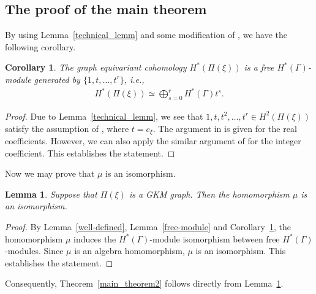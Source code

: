 \documentclass[12pt]{amsart}
\newtheorem{lemma}[theorem]{Lemma}
\newtheorem{corollary}[theorem]{Corollary}
\theoremstyle{definition}
\theoremstyle{remark}
\numberwithin{equation}{section}
\begin{document}
\subsection{The proof of the main theorem}
\label{sect:5.4}

By using Lemma~\ref{technical_lemm} and some modification of \cite[Theorem~3.5]{GSZ}, we have the following corollary.
\begin{corollary}
\label{Q_k}
The graph equivariant cohomology $H^{*}(\Pi(\xi))$ is a free $H^{*}(\Gamma)$-module generated by $\{1,t,\ldots,t^{r}\}$, i.e.,
\begin{align}
\label{decomposition_of_f}
H^{*}(\Pi(\xi))\simeq \bigoplus_{s=0}^{r}H^{*}(\Gamma)t^{s}.
\end{align}
\end{corollary}
\begin{proof}
Due to Lemma~\ref{technical_lemm}, we see that $1, t, t^{2},\ldots, t^{r}\in H^{2}(\Pi(\xi))$ satisfy the assumption of \cite[Theorem~3.5]{GSZ}, where $t=c_{\xi}$.
The argument in \cite[Theorem~3.5]{GSZ} is given for the real coefficients.
However,
we can also apply the similar argument of \cite[Theorem~3.5]{GSZ} for the integer coefficient.
This establishes the statement.
\end{proof}

Now we may prove that $\mu$ is an isomorphism.
\begin{lemma}
\label{isomorphism}
Suppose that $\Pi(\xi)$ is a GKM graph. Then the homomorphism $\mu$ is an isomorphism.
\end{lemma}
\begin{proof}
By Lemma~\ref{well-defined}, Lemma~\ref{free-module} and Corollary~\ref{Q_k},
the homomorphism $\mu$ induces the $H^{*}(\Gamma)$-module isomorphism between free $H^{*}(\Gamma)$-modules.
Since $\mu$ is an algebra homomorphism,
$\mu$ is an isomorphism. This establishes the statement.
\end{proof}

Consequently, Theorem~\ref{main_theorem2} follows directly from
Lemma~\ref{isomorphism}.

\end{document}

